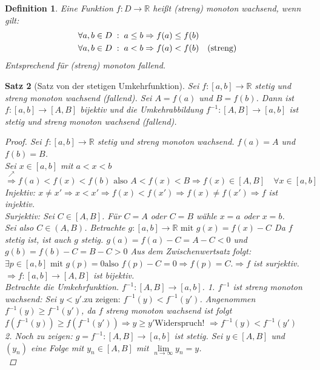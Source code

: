 \documentclass[a4paper,titlepage,oneside]{article}
\def\R{\ensuremath{\mathbb{R}} }
\def\WSP{\text{Widerspruch! }}
\def\zz{\text{zu zeigen: }}
\def\sp{\hspace{0,1cm}}
\def\spcolon{\sp:\sp}
\renewcommand{\liminf}[2][n]{\ensuremath{\lim\limits_{#1 \rightarrow \infty}{#2}}}
\theoremstyle{thmstyle}
\newtheorem{satz}{Satz}[section]
\newtheorem{defi}[satz]{Definition}
\theoremstyle{subthmstyle}
\begin{document}
\begin{defi}
Eine Funktion $f: D \to \R$ heißt (streng) monoton wachsend, wenn gilt:
\begin{align*}
&\forall a,b \in D \spcolon a \le b \Rightarrow f(a) \le f(b) \\
&\forall a,b \in D \spcolon a < b \Rightarrow f(a) < f(b) \quad \text{(streng)}
\end{align*}
Entsprechend für (streng) monoton fallend.
\end{defi}

\begin{satz}[Satz von der stetigen Umkehrfunktion]
Sei $f: [a,b] \to \R$ stetig und streng monoton wachsend (fallend). Sei $ A= f(a)$ und $ B = f(b)$.
Dann ist $f: [a,b] \to [A,B]$ bijektiv und die Umkehrabbildung $f^{-1} : [A,B] \to [a,b]$ ist stetig und streng monoton wachsend (fallend).
\begin{proof}
Sei $f: [a,b] \to \R$ stetig und streng monoton wachsend. $f(a) = A$ und $f(b) = B$.\\
Sei $x \in[a,b]$ mit $a < x < b$\\
$\overset{\nearrow}{\Rightarrow} f(a) < f(x) < f(b) \text{ also } A < f(x) < B \Rightarrow f(x) \in [A,B] \quad \forall x \in[a,b]$\\
Injektiv: $x \ne x' \Rightarrow x < x' \Rightarrow f(x) < f(x') \Rightarrow f(x) \ne f(x') \Rightarrow f$ ist injektiv.\\
Surjektiv: Sei $ C \in [A,B]$. Für $C = A $ oder $C = B$ wähle $ x = a$ oder $x = b$.\\
Sei also $C \in (A,B)$. Betrachte $g: [a,b] \to \R \text{ mit } g(x) = f(x)-C$ Da $f$ stetig ist, ist auch $g$ stetig. $g(a) = f(a) -C = A- C < 0$ und $g(b) = f(b) -C = B - C > 0$ Aus dem Zwischenwertsatz folgt: $\exists p \in [a,b]\text{ mit }g(p) = 0\text{also } f(p) - C = 0 \Rightarrow f(p) = C. \Rightarrow f$ ist surjektiv.\\
$\Rightarrow  f: [a,b] \to [A,B] $ ist bijektiv.\\
Betrachte die Umkehrfunktion. $f^{-1} : [A,B] \to [a,b]$.
1. $f^{-1}$  ist streng monoton wachsend:
Sei $y < y'. \zz f^{-1}(y) < f^{-1}(y')$.
Angenommen $f^{-1}(y) \ge f^{-1}(y')$, da $f$ streng monoton wachsend ist folgt $f(f^{-1}(y)) \ge f(f^{-1}(y')) \Rightarrow y \ge y' \WSP \Rightarrow f^{-1}(y) < f^{-1}(y')$\\
2. Noch zu zeigen: $g = f^{-1}: [A,B] \to [a,b]$ ist stetig.
Sei $y \in [A,B]$ und $(y_n)$ eine Folge mit $y_n \in[A,B]$ mit $\liminf{y_n} = y$.\\

\end{proof}
\end{satz}
\end{document}
